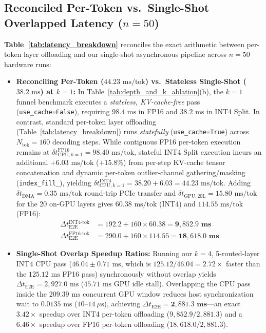 \documentclass[10pt,twocolumn]{article}
\begin{document}
\subsection{Reconciled Per-Token vs.\ Single-Shot Overlapped Latency ($n = 50$)}
\textbf{Table~\ref{tab:latency_breakdown}} reconciles the exact arithmetic between per-token layer offloading and our single-shot asynchronous pipeline across $n=50$ hardware runs:
\begin{itemize}
    \item \textbf{Reconciling Per-Token ($44.23\text{ ms/tok}$) vs.\ Stateless Single-Shot ($38.2\text{ ms}$) at $k=1$:} In Table~\ref{tab:depth_and_k_ablation}(b), the $k=1$ funnel benchmark executes a \emph{stateless, KV-cache-free} pass (\texttt{use\_cache=False}), requiring $98.4\text{ ms}$ in FP16 and $38.2\text{ ms}$ in INT4 Split. In contrast, standard per-token layer offloading (Table~\ref{tab:latency_breakdown}) runs \emph{statefully} (\texttt{use\_cache=True}) across $N_{\text{tok}}=160$ decoding steps. While contiguous FP16 per-token execution remains at $\delta t_{\text{CPU}, k=1}^{\text{FP16}} = 98.40\text{ ms/tok}$, stateful INT4 Split execution incurs an additional $+6.03\text{ ms/tok}$ ($+15.8\%$) from per-step KV-cache tensor concatenation and dynamic per-token outlier-channel gathering/masking (\texttt{index\_fill\_}), yielding $\delta t_{\text{CPU}, k=1}^{\text{INT4}} = 38.20 + 6.03 = 44.23\text{ ms/tok}$. Adding $\delta t_{\text{DMA}} = 0.35\text{ ms/tok}$ round-trip PCIe transfer and $\delta t_{\text{GPU},20\text{L}} = 15.80\text{ ms/tok}$ for the 20 on-GPU layers gives $60.38\text{ ms/tok}$ (INT4) and $114.55\text{ ms/tok}$ (FP16):
    \begin{align}
        \Delta t_{\text{E2E}}^{\text{INT4-tok}} &= 192.2 + 160 \times 60.38 = \mathbf{9,852.9\text{ ms}} \\
        \Delta t_{\text{E2E}}^{\text{FP16-tok}} &= 290.0 + 160 \times 114.55 = \mathbf{18,618.0\text{ ms}}
    \end{align}
    \item \textbf{Single-Shot Overlap Speedup Ratios:} Running our $k=4$, 5-routed-layer INT4 CPU pass ($46.04 \pm 0.71\text{ ms}$, which is $125.12 / 46.04 = \mathbf{2.72\times}$ faster than the $125.12\text{ ms}$ FP16 pass) synchronously without overlap yields $\Delta t_{\text{E2E}} = 2,927.0\text{ ms}$ ($45.71\text{ ms}$ GPU idle stall). Overlapping the CPU pass inside the $209.39\text{ ms}$ concurrent GPU window reduces host synchronization wait to $0.0135\text{ ms}$ ($10\text{--}14\ \mu\text{s}$), achieving $\Delta t_{\text{E2E}} = \mathbf{2,881.3\text{ ms}}$---an exact $\mathbf{3.42\times}$ speedup over INT4 per-token offloading ($9,852.9 / 2,881.3$) and a $\mathbf{6.46\times}$ speedup over FP16 per-token offloading ($18,618.0 / 2,881.3$).
\end{itemize}
\end{document}
